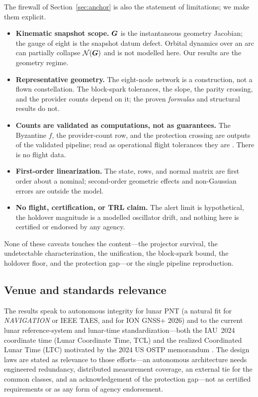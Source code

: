 The firewall of Section~\ref{sec:anchor} is also the statement of limitations; we make them
explicit.
\begin{itemize}
  \item \textbf{Kinematic snapshot scope.} $\bm{G}$ is the instantaneous geometry Jacobian;
  the gauge of eight is the snapshot datum defect. Orbital dynamics over an arc
  \citep{hillborn2007} can partially collapse $\mathcal{N}(\bm{G})$ and is not modelled here. Our
  results are the geometry regime.
  \item \textbf{Representative geometry.} The eight-node network is a construction, not a
  flown constellation. The block-spark tolerances, the slope, the parity crossing, and the
  provider counts depend on it; the proven \emph{formulas} and structural results do not.
  \item \textbf{Counts are validated as computations, not as guarantees.} The Byzantine $f$,
  the provider-count row, and the protection crossing are outputs of the validated pipeline;
  read as operational flight tolerances they are \Modelled{}. There is no flight data.
  \item \textbf{First-order linearization.} The state, rows, and normal matrix are first
  order about a nominal; second-order geometric effects and non-Gaussian errors are outside
  the model.
  \item \textbf{No flight, certification, or TRL claim.} The alert limit is hypothetical, the
  holdover magnitude is a modelled oscillator drift, and nothing here is certified or endorsed
  by any agency.
\end{itemize}
None of these caveats touches the \Proven{} content---the projector survival, the
undetectable characterization, the unification, the block-spark bound, the holdover floor, and
the protection gap---or the single \Validated{} pipeline reproduction.

\subsection{Venue and standards relevance}
\label{sec:venue}

The results speak to autonomous integrity for lunar PNT (a natural fit for \emph{NAVIGATION}
or IEEE TAES, and for ION GNSS+ 2026) and to the current lunar reference-system and lunar-time
standardization---both the IAU~2024 coordinate time (Lunar Coordinate Time, TCL) and the
realized Coordinated Lunar Time (LTC) motivated by the 2024 US OSTP memorandum
\citep{iau2024ltc,fienga2024moonlight,lnis2023}. The
design laws are stated as relevance to those efforts---an autonomous architecture needs
engineered redundancy, distributed measurement coverage, an external tie for the common
classes, and an acknowledgement of the protection gap---not as certified requirements or as
any form of agency endorsement.
